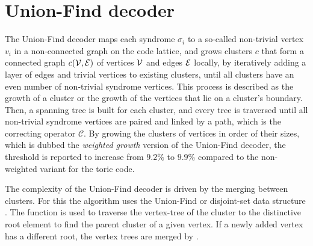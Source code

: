 \section{Union-Find decoder}\label{sec:unionfind}

The Union-Find decoder \cite{delfosse2017linear, delfosse2017almost} maps each syndrome $\sigma_i$ to a so-called non-trivial vertex $v_i$ in a non-connected graph on the code lattice, and grows clusters $c$ that form a connected graph $c(\mathcal{V}, \mathcal{E})$ of vertices $\mathcal{V}$ and edges $\mathcal{E}$ locally, by iteratively adding a layer of edges and trivial vertices to existing clusters, until all clusters have an even number of non-trivial syndrome vertices. This process is described as the growth of a cluster or the growth of the vertices that lie on a cluster's boundary. Then, a spanning tree is built for each cluster, and every tree is traversed until all non-trivial syndrome vertices are paired and linked by a path, which is the correcting operator $\mathcal{C}$. By growing the clusters of vertices in order of their sizes, which is dubbed the \emph{weighted growth} version of the Union-Find decoder, the threshold is reported to increase from $9.2\%$ to $9.9\%$ compared to the non-weighted variant for the toric code. 

The complexity of the Union-Find decoder is driven by the merging between clusters. For this the algorithm uses the Union-Find or disjoint-set data structure \cite{tarjan1975efficiency}. The function  is used to traverse the vertex-tree of the cluster to the distinctive root element to find the parent cluster of a given vertex. If a newly added vertex has a different root, the vertex trees are merged by . 